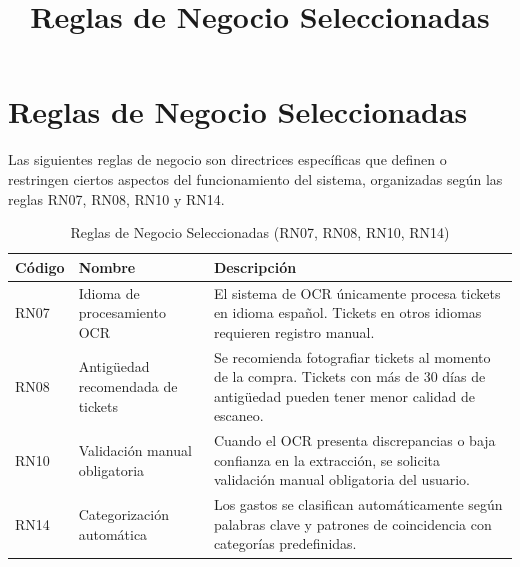 \documentclass[12pt,a4paper]{article}
\title{Reglas de Negocio Seleccionadas}
\author{}
\date{}
\begin{document}
\maketitle

\section{Reglas de Negocio Seleccionadas}

Las siguientes reglas de negocio son directrices específicas que definen o restringen ciertos aspectos del funcionamiento del sistema, organizadas según las reglas RN07, RN08, RN10 y RN14.

\begin{table}[H]
\centering
\renewcommand{\arraystretch}{1.2}
\begin{tabularx}{\textwidth}{@{} l l X @{}}
\toprule
\textbf{Código} & \textbf{Nombre} & \textbf{Descripción} \\
\midrule

RN07 & Idioma de procesamiento OCR &
El sistema de OCR únicamente procesa tickets en idioma español. Tickets en otros idiomas requieren registro manual. \\

RN08 & Antigüedad recomendada de tickets &
Se recomienda fotografiar tickets al momento de la compra. Tickets con más de 30 días de antigüedad pueden tener menor calidad de escaneo. \\

RN10 & Validación manual obligatoria &
Cuando el OCR presenta discrepancias o baja confianza en la extracción, se solicita validación manual obligatoria del usuario. \\

RN14 & Categorización automática &
Los gastos se clasifican automáticamente según palabras clave y patrones de coincidencia con categorías predefinidas. \\

\bottomrule
\end{tabularx}
\caption{Reglas de Negocio Seleccionadas (RN07, RN08, RN10, RN14)}
\end{table}
\end{document}
